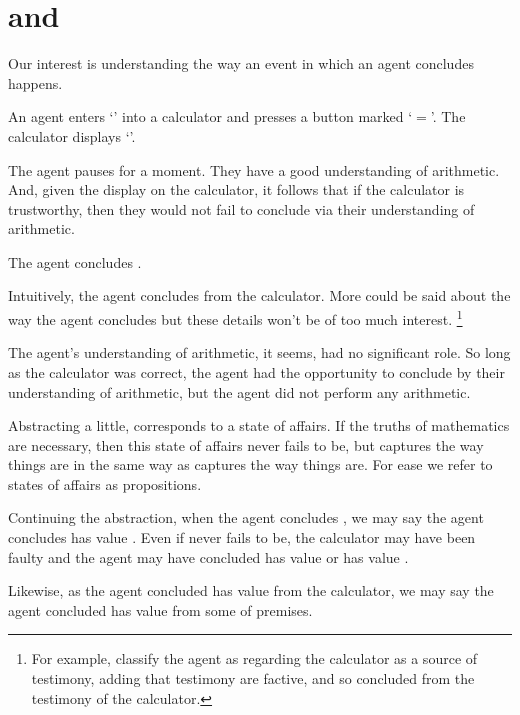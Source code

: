 \chapter{\qWhy{} and \qHow{}}
\label{cha:intro}

\begin{note}
  Our interest is understanding the way an event in which an agent concludes happens.

  \begin{scenario}[Calculation]%
    \label{scen:calc}%
    An agent enters `\gistCalcLHS{}' into a calculator and presses a button marked `\(=\)'.
    The calculator displays `\gistCalcRHS{}'.

    The agent pauses for a moment.
    They have a good understanding of arithmetic.
    And, given the display on the calculator, it follows that if the calculator is trustworthy, then they would not fail to conclude \propM{\gistCalcEq{}} via their understanding of arithmetic.

    The agent concludes \propM{\gistCalcEq{}}.
  \end{scenario}

  \noindent%
  Intuitively, the agent concludes \propM{\gistCalcEq{}} from the calculator.
  More could be said about the way the agent concludes but these details won't be of too much interest.%
  \footnote{
    For example, classify the agent as regarding the calculator as a source of testimony, adding that testimony are factive, and so concluded \propM{\gistCalcEq{}} from the testimony of the calculator.
  }

  The agent's understanding of arithmetic, it seems, had no significant role.
  So long as the calculator was correct, the agent had the opportunity to conclude \propM{\gistCalcEq{}} by their understanding of arithmetic, but the agent did not perform any arithmetic.
\end{note}

\begin{note}
  Abstracting a little, \propM{\gistCalcEq{}} corresponds to a state of affairs.
  If the truths of mathematics are necessary, then this state of affairs never fails to be, but \propM{\gistCalcEq{}} captures the way things are in the same way as  captures the way things are.
  For ease we refer to states of affairs as propositions.

  Continuing the abstraction, when the agent concludes \propM{\gistCalcEq{}}, we may say the agent concludes \propM{\gistCalcEq{}} has value .
  Even if \propM{\gistCalcEq{}} never fails to be, the calculator may have been faulty and the agent may have concluded \propM{\gistCalcEqBad{}} has value  or \propM{\gistCalcEq{}} has value .

  Likewise, as the agent concluded \propM{\gistCalcEq{}} has value  from the calculator, we may say the agent concluded \propM{\gistCalcEq{}} has value  from some \pool{} of premises.
\end{note}


